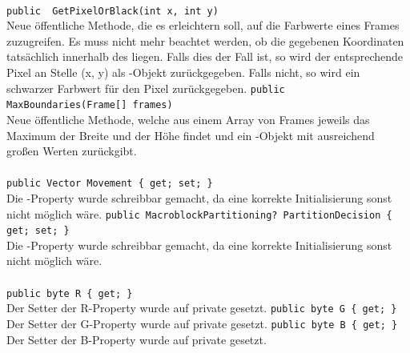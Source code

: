 \paragraph{}
\begin{itemize}
	\add \verb!public  GetPixelOrBlack(int x, int y)! \\
	Neue öffentliche Methode, die es erleichtern soll, auf die Farbwerte eines Frames zuzugreifen. Es muss nicht mehr beachtet werden, ob die gegebenen Koordinaten tatsächlich innerhalb des  liegen. Falls dies der Fall ist, so wird der entsprechende Pixel an Stelle (x, y) als -Objekt zurückgegeben. Falls nicht, so wird ein schwarzer Farbwert für den Pixel zurückgegeben.
	\add \verb!public MaxBoundaries(Frame[] frames)! \\
	Neue öffentliche Methode, welche aus einem Array von Frames jeweils das Maximum der Breite und der Höhe findet und ein -Objekt mit ausreichend großen Werten zurückgibt.
\end{itemize}

\paragraph{}
\begin{itemize}
	\change \verb!public Vector Movement { get; set; }! \\
	Die -Property wurde schreibbar gemacht, da eine korrekte Initialisierung sonst nicht möglich wäre.
	\change \verb!public MacroblockPartitioning? PartitionDecision { get; set; }! \\
	Die -Property wurde schreibbar gemacht, da eine korrekte Initialisierung sonst nicht möglich wäre.
\end{itemize}

\paragraph{}
\begin{itemize}
	\change \verb!public byte R { get; }! \\
	Der Setter der R-Property wurde auf private gesetzt.
	\change \verb!public byte G { get; }! \\
	Der Setter der G-Property wurde auf private gesetzt.
	\change \verb!public byte B { get; }! \\
	Der Setter der B-Property wurde auf private gesetzt.
\end{itemize}

